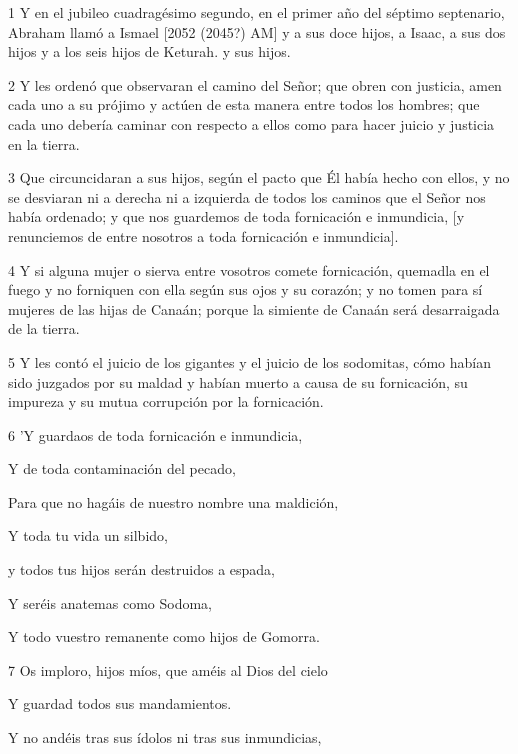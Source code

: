 \par 1 Y en el jubileo cuadragésimo segundo, en el primer año del séptimo septenario, Abraham llamó a Ismael [2052 (2045?) AM] y a sus doce hijos, a Isaac, a sus dos hijos y a los seis hijos de Keturah. y sus hijos.
\par 2 Y les ordenó que observaran el camino del Señor; que obren con justicia, amen cada uno a su prójimo y actúen de esta manera entre todos los hombres; que cada uno debería caminar con respecto a ellos como para hacer juicio y justicia en la tierra.
\par 3 Que circuncidaran a sus hijos, según el pacto que Él había hecho con ellos, y no se desviaran ni a derecha ni a izquierda de todos los caminos que el Señor nos había ordenado; y que nos guardemos de toda fornicación e inmundicia, [y renunciemos de entre nosotros a toda fornicación e inmundicia].
\par 4 Y si alguna mujer o sierva entre vosotros comete fornicación, quemadla en el fuego y no forniquen con ella según sus ojos y su corazón; y no tomen para sí mujeres de las hijas de Canaán; porque la simiente de Canaán será desarraigada de la tierra.
\par 5 Y les contó el juicio de los gigantes y el juicio de los sodomitas, cómo habían sido juzgados por su maldad y habían muerto a causa de su fornicación, su impureza y su mutua corrupción por la fornicación.
\par    
\par 6 'Y guardaos de toda fornicación e inmundicia,  
\par     Y de toda contaminación del pecado,
\par    
\par     Para que no hagáis de nuestro nombre una maldición,  
\par     Y toda tu vida un silbido,
\par    
\par     y todos tus hijos serán destruidos a espada,  
\par     Y seréis anatemas como Sodoma,  
\par     Y todo vuestro remanente como hijos de Gomorra.
\par    
\par 7 Os imploro, hijos míos, que améis al Dios del cielo  
\par     Y guardad todos sus mandamientos.
\par    
\par     Y no andéis tras sus ídolos ni tras sus inmundicias,  
